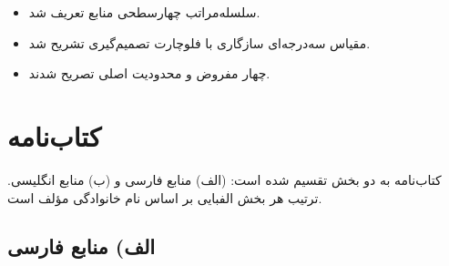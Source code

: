 \begin{principleBox}
\begin{itemize}
\item سلسله‌مراتب چهارسطحی منابع تعریف شد.
\item مقیاس سه‌درجه‌ای سازگاری
      با فلوچارت تصمیم‌گیری تشریح شد.
\item چهار مفروض و محدودیت اصلی تصریح شدند.
\end{itemize}
\end{principleBox}



%

\cleardoublepage
{}
{}
\chapter*{کتاب‌نامه}
\label{ch:bibliography}

\begin{infoBox}
کتاب‌نامه به دو بخش تقسیم شده است:
(الف) منابع فارسی و (ب) منابع انگلیسی.
ترتیب هر بخش الفبایی بر اساس نام خانوادگی مؤلف است.
\end{infoBox}

\section*{الف) منابع فارسی}

